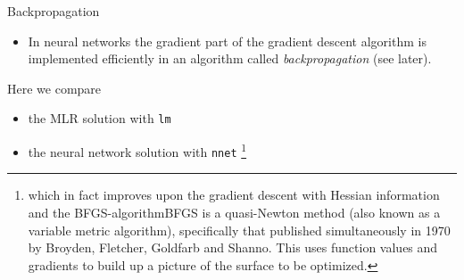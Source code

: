 \documentclass[10pt,ignorenonframetext,]{beamer}
\providecommand{\tightlist}{%
  \setlength{\itemsep}{0pt}\setlength{\parskip}{0pt}}
\begin{document}
\begin{frame}[fragile]

\begin{block}{Backpropagation}

\vspace{2mm}

\begin{itemize}
\tightlist
\item
  In neural networks the gradient part of the gradient descent algorithm
  is implemented efficiently in an algorithm called
  \emph{backpropagation} (see later).
\end{itemize}

\vspace{4mm}

Here we compare

\begin{itemize}
\tightlist
\item
  the MLR solution with \texttt{lm}
\item
  the neural network solution with \texttt{nnet}
  \footnote{which in fact improves upon the gradient descent with Hessian information and the BFGS-algorithmBFGS is a quasi-Newton method (also known as a variable metric algorithm), specifically that published simultaneously in 1970 by Broyden, Fletcher, Goldfarb and Shanno. This uses function values and gradients to build up a picture of the surface to be optimized.}
\end{itemize}

\end{block}

\end{frame}
\end{document}
